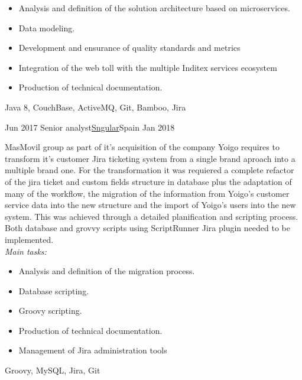 \begin{experiences}
{                      \begin{itemize}
                        \item Analysis and definition of the solution architecture based on microservices.
                        \item Data modeling.
                        \item Development and ensurance of quality standards and metrics
                        \item Integration of the web toll with the multiple Inditex services ecosystem
                        \item Production of technical documentation.
                      \end{itemize}
                    }
                    {Java 8, CouchBase, ActiveMQ, Git, Bamboo, Jira}
                    
  \emptySeparator

 \experience
    {Jun 2017} {Senior analyst}{\href{https://sngular.com/}{Sngular}}{Spain}
    {Jan 2018}    {

MasMovil group as part of it's acquisition of the company Yoigo requires to transform it's customer Jira ticketing system from a single brand aproach into a multiple brand one.
For the transformation it was requiered a complete refactor of the jira ticket and custom fields structure in database plus the adaptation of many of the workflow, the migration of the information from Yoigo's customer service data into the new structure and the import of Yoigo's users into the new system. This was achieved through a detailed planification and scripting process. Both database and grovvy scripts using ScriptRunner Jira plugin needed to be implemented.
\\
\emph{Main tasks:}
    	
                      \begin{itemize}
                        \item Analysis and definition of the migration process.
                        \item Database scripting.
                        \item Groovy scripting.
                        \item Production of technical documentation.
                        \item Management of Jira administration tools
                      \end{itemize}
                    }
                    {Groovy, MySQL, Jira, Git}
                    

\end{experiences}

